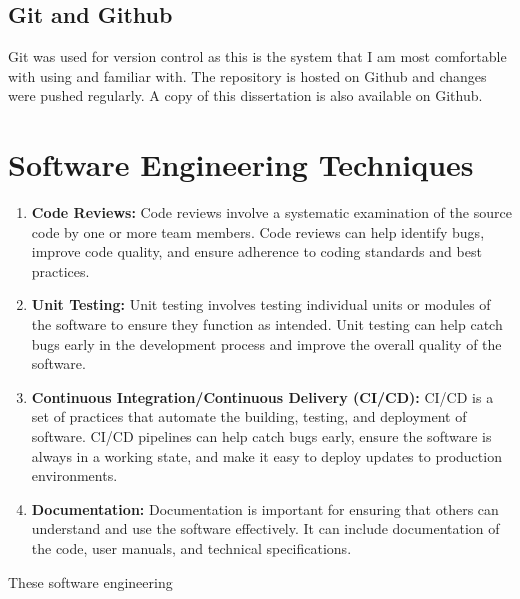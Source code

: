 \documentclass[final,rdr32.tex]{subfiles}
\begin{document}
\subsection{Git and Github}

Git was used for version control as this is the system that I am most comfortable with using and familiar with. The repository is hosted on Github and changes were pushed regularly. A copy of this dissertation is also available on Github.

\section{Software Engineering Techniques}

\begin{enumerate}

    \item \textbf{Code Reviews:} Code reviews involve a systematic examination of the source code by one or more team members. Code reviews can help identify bugs, improve code quality, and ensure adherence to coding standards and best practices.
    \item \textbf{Unit Testing:} Unit testing involves testing individual units or modules of the software to ensure they function as intended. Unit testing can help catch bugs early in the development process and improve the overall quality of the software.
    \item \textbf{Continuous Integration/Continuous Delivery (CI/CD):} CI/CD is a set of practices that automate the building, testing, and deployment of software. CI/CD pipelines can help catch bugs early, ensure the software is always in a working state, and make it easy to deploy updates to production environments.
    \item \textbf{Documentation:} Documentation is important for ensuring that others can understand and use the software effectively. It can include documentation of the code, user manuals, and technical specifications.
\end{enumerate}

These software engineering
\end{document}
